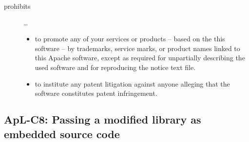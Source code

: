 \begin{description}
\begin{itemize}
\end{itemize}

\item[prohibits] \ldots
\begin{itemize}
  \item to promote any of your services or products – based on the this software
  – by trademarks, service marks, or product names linked to this Apache
  software, except as required for unpartially describing the used software and
  for reproducing the notice text file.
  \item to institute any patent litigation against anyone alleging that the
  software constitutes patent infringement.
\end{itemize}

\end{description}

\subsection{ApL-C8: Passing a modified library as embedded source code}
\label{OSUC-10S-Apache20}

